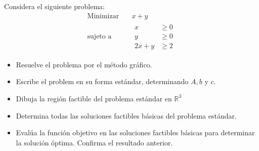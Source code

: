 \documentclass{article}
\begin{document}
Considera el siguiente problema:
\begin{equation*}
  \begin{aligned}
    \text{Minimizar}\quad  &   x+y \\
    \text{sujeto a}\quad   &
    \begin{aligned}
      x     & \geq 0 \\
      y     & \geq 0 \\
      2x+y  & \geq 2
    \end{aligned}
  \end{aligned}
\end{equation*}
\begin{itemize}
\item Resuelve el problema por el método gráfico.
\item Escribe el problem en su forma estándar, determinando $A, b$ y $c$.
\item Dibuja la región factible del problema estándar en $\mathbb{R}^3$
\item Determina todas las soluciones factibles básicas del problema estándar.
\item Evalúa la función objetivo en las soluciones factibles básicas para determinar la solución óptima. Confirma el resultado anterior. 
\end{itemize}
\end{document}
